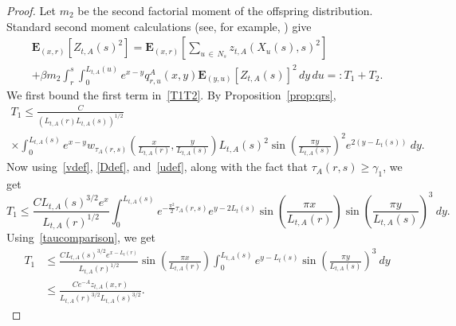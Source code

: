 \documentclass[10pt]{amsart}
\theoremstyle{definition}\newtheorem{defi}[theo]{Definition}\newtheorem{rema}[theo]{Remark}\newtheorem{exam}[theo]{Example}\newtheorem{exem}[theo]{Example}\newtheorem{nota}[theo]{Notation}
\newcommand*\E{\mathbf{E}}
\newcommand{\1} {\mathds{1}}
\begin{document}
\begin{proof}
Let $m_2$ be the second factorial moment of the offspring distribution. Standard second moment calculations (see, for example, \cite[p.~146]{inw}) give
\begin{multline}\label{T1T2}
\E_{(x,r)}\left[Z_{t,A}(s)^2\right] 
= \E_{(x,r)}\left[\sum_{u\,\in\,N_s} z_{t,A}(X_u(s),s)^2\right]\\
+ \beta m_2 \int_r^s \int_0^{L_{t,A}(u)} e^{x-y}q^A_{r,u}(x,y)\E_{(y,u)}\left[Z_{t,A}(s)\right]^2\,dy\, du 
=: T_1 + T_2.
\end{multline}
We first bound the first term in~\eqref{T1T2}. By Proposition~\ref{prop:qrs},
\begin{multline*}
T_1 \leq \frac{C}{\left(L_{t,A}(r) L_{t,A}(s)\right)^{1/2}} \\
\times \int_0^{L_{t,A}(s)} e^{x-y} w_{\tau_A(r,s)} \left(\frac{x}{L_{t,A}(r)}, \frac{y}{L_{t,A}(s)} \right) L_{t,A}(s)^2 \sin \left(\frac{\pi y}{L_{t,A}(s)} \right)^2 e^{2(y - L_t(s))} \: dy.
\end{multline*}
Now using~\eqref{vdef}, \eqref{Ddef}, and~\eqref{udef}, along with the fact that $\tau_A(r,s) \geq \gamma_1$, we get
\[
T_1 \leq \frac{C L_{t,A}(s)^{3/2} e^{x}}{L_{t,A}(r)^{1/2}} \int_0^{L_{t,A}(s)} e^{-\frac{\pi^2}{2} \tau_A(r,s)} e^{y - 2 L_t(s)} \sin \left(\frac{\pi x}{L_{t,A}(r)} \right) \sin \left(\frac{\pi y}{L_{t,A}(s)} \right)^3 \: dy.
\]
Using~\eqref{taucomparison}, we get
\begin{equation}\label{T1}
\begin{split}
T_1 &\leq \frac{C L_{t,A}(s)^{3/2} e^{x - L_t(r)}}{L_{t,A}(r)^{1/2}} \sin \left(\frac{\pi x}{L_{t,A}(r)} \right) \int_0^{L_{t,A}(s)} e^{y-L_t(s)} \sin \left(\frac{\pi y}{L_{t,A}(s)} \right)^3 \: dy \\
&\leq \frac{C e^{-A} z_{t,A}(x,r)}{L_{t,A}(r)^{3/2} L_{t,A}(s)^{3/2}}.
\end{split}
\end{equation}


\end{proof}
\end{document}
